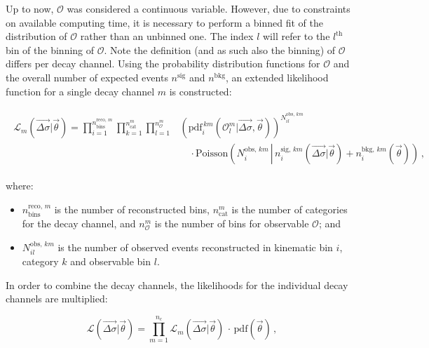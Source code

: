 Up to now, $\mathcal{O}$ was considered a continuous variable.
% 
However, due to constraints on available computing time, it is necessary to perform a binned fit of the distribution of $\mathcal{O}$ rather than an unbinned one.
% 
The index $l$ will refer to the $l^\text{th}$ bin of the binning of $\mathcal{O}$.
% 
Note the definition (and as such also the binning) of $\mathcal{O}$ differs per decay channel.
% 
Using the probability distribution functions for $\mathcal{O}$ and the overall number of expected events $n^\text{sig}$ and $n^\text{bkg}$, an extended likelihood function for a single decay channel $m$ is constructed:
% 
\begin{linenomath*}
\begin{align}
\begin{split}
\mathcal{L}_m(\vec{\Delta\sigma} | \vec{\theta}) =
    \prod_{i=1}^{n_\text{bins}^{\text{reco},\,m}}
    \prod_{k=1}^{n_\text{cat}^m}
    \prod_{l=1}^{n_\mathcal{O}^m}
        &
        \left(
        \text{pdf}_i^{\,km}(\mathcal{O}_l^m | \vec{\Delta\sigma}, \vec{\theta})
        \right)^{ N^{\text{obs},\,km}_{il} }
        \\
        & \quad \cdot
        \text{Poisson}\left(
            N^{\text{obs},\,km}_{i}
            \, \left| \,
            n_i^{\text{sig},\,km}(\vec{\Delta\sigma} | \vec{\theta})
            + n^{\text{bkg},\,km}_i(\vec{\theta})
            \right)\right.
\,,
\label{eq:L_per_decaychannel}
\end{split}
\end{align}
\end{linenomath*}
% 
where:
% 
\begin{itemize}
\item $n_\text{bins}^{\text{reco},\,m}$ is the number of reconstructed bins,
$n_\text{cat}^m$ is the number of categories for the decay channel,
and $n_\mathcal{O}^m$ is the number of bins for observable $\mathcal{O}$; and
% 
\item $N^{\text{obs},\,km}_{il}$ is the number of observed events reconstructed in kinematic bin $i$, category $k$ and observable bin $l$.
\end{itemize}
% 
In order to combine the decay channels, the likelihoods for the individual decay channels are multiplied:
% 
\begin{linenomath*}
\begin{equation}
\label{eq:fulllikelihood}
\mathcal{L}(\vec{\Delta\sigma} | \vec{\theta})
= \prod_{m=1}^{n_c} \mathcal{L}_m(\vec{\Delta\sigma} | \vec{\theta})
    \,\cdot\,
    \text{pdf}(\vec{\theta})
\,,
\end{equation}
\end{linenomath*}
